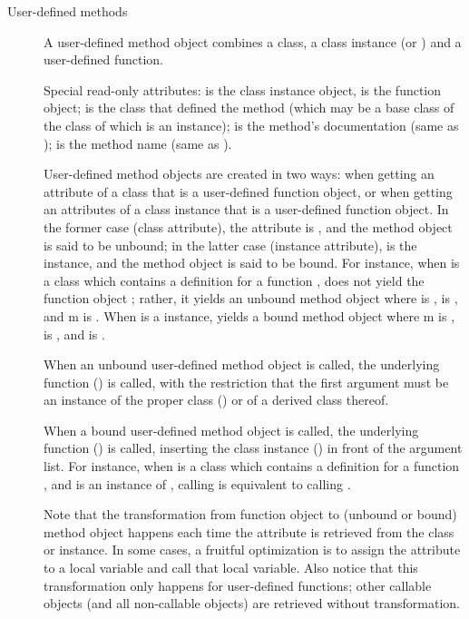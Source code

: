 \begin{description}
\begin{description}
\item[User-defined methods]
A user-defined method object combines a class, a class instance (or
) and a user-defined function.

Special read-only attributes:  is the class instance
object,  is the function object;
 is the class that defined the method (which may be a
base class of the class of which  is an instance);
 is the method's documentation (same as
);  is the method name (same as
).

User-defined method objects are created in two ways: when getting an
attribute of a class that is a user-defined function object, or when
getting an attributes of a class instance that is a user-defined
function object.  In the former case (class attribute), the
 attribute is , and the method object is said
to be unbound; in the latter case (instance attribute), 
is the instance, and the method object is said to be bound.  For
instance, when  is a class which contains a definition for a
function ,  does not yield the function object
; rather, it yields an unbound method object  where
 is ,  is , and
m is .  When  is a 
instance,  yields a bound method object  where
m is ,  is , and
 is .

When an unbound user-defined method object is called, the underlying
function () is called, with the restriction that the
first argument must be an instance of the proper class
() or of a derived class thereof.

When a bound user-defined method object is called, the underlying
function () is called, inserting the class instance
() in front of the argument list.  For instance, when
 is a class which contains a definition for a function
, and  is an instance of , calling
 is equivalent to calling .

Note that the transformation from function object to (unbound or
bound) method object happens each time the attribute is retrieved from
the class or instance.  In some cases, a fruitful optimization is to
assign the attribute to a local variable and call that local variable.
Also notice that this transformation only happens for user-defined
functions; other callable objects (and all non-callable objects) are
retrieved without transformation.


\end{description}
\end{description}
